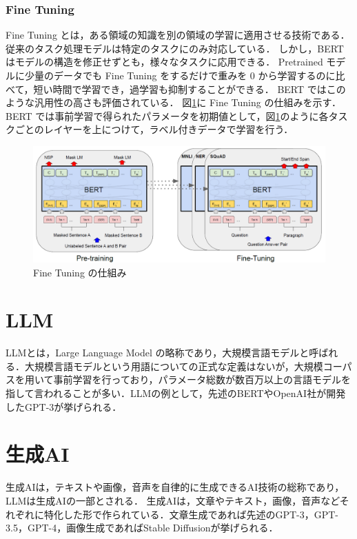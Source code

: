 \subsubsection{Fine Tuning}
Fine Tuning とは，ある領域の知識を別の領域の学習に適用させる技術である．
従来のタスク処理モデルは特定のタスクにのみ対応している．
しかし，BERT はモデルの構造を修正せずとも，様々なタスクに応用できる．
Pretrained モデルに少量のデータでも Fine Tuning をするだけで重みを 0 から学習するのに比べて，短い時間で学習でき，過学習も抑制することができる．
BERT ではこのような汎用性の高さも評価されている．
図\ref{finetuning}に Fine Tuning の仕組みを示す．
BERT では事前学習で得られたパラメータを初期値として，図\ref{finetuning}のように各タスクごとのレイヤーを上につけて，ラベル付きデータで学習を行う．

\begin{figure}[H]
	\centering
	\includegraphics[width=120mm]{image/BERT-finetuning.png}
	\caption{Fine Tuning の仕組み}
	\label{finetuning}
\end{figure}



\section{LLM \label{c4s6}}
LLMとは，Large Language Model の略称であり，大規模言語モデルと呼ばれる．大規模言語モデルという用語についての正式な定義はないが，大規模コーパスを用いて事前学習を行っており，パラメータ総数が数百万以上の言語モデルを指して言われることが多い．LLMの例として，先述のBERTやOpenAI社が開発したGPT-3が挙げられる．

\section{生成AI \label{c4s7}}
生成AIは，テキストや画像，音声を自律的に生成できるAI技術の総称であり，LLMは生成AIの一部とされる．
生成AIは，文章やテキスト，画像，音声などそれぞれに特化した形で作られている．文章生成であれば先述のGPT-3，GPT-3.5，GPT-4，画像生成であればStable Diffusionが挙げられる．

